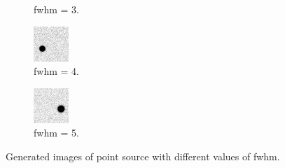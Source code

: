 \begin{figure}[!h]
\begin{subfigure}{.23\textwidth}
        \caption{fwhm = 3.}
        \label{fig:pointfwhm3}
    \end{subfigure}
    \begin{subfigure}{.23\textwidth}
        \centering
        \includegraphics[width=\textwidth]{images/fwhm4.png}
        \caption{fwhm = 4.}
        \label{fig:pointfwhm4}
    \end{subfigure}
    \begin{subfigure}{.23\textwidth}
        \centering
        \includegraphics[width=\textwidth]{images/fwhm5.png}
        \caption{fwhm = 5.}
        \label{fig:pointfwhm5}
    \end{subfigure}

    \caption{Generated images of point source with different values of fwhm.}
    \label{fig:pointfwhm}
\end{figure}



